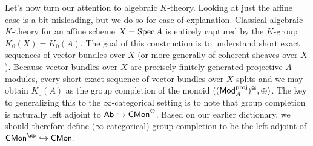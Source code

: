\documentclass[11pt]{article}
\DeclareMathOperator{\proj}{proj} %
\newcommand{\CMon}{\mathsf{CMon}} %
\begin{document}
Let's now turn our attention to algebraic $K$-theory. Looking at just the affine case is a bit misleading, but we do so for ease of explanation. Classical algebraic $K$-theory for an affine scheme $X=\operatorname{Spec} A$ is entirely captured by the $K$-group $K_0(X)=K_0(A)$. The goal of this construction is to understand short exact sequences of vector bundles over $X$ (or more generally of coherent sheaves over $X$). Because vector bundles over $X$ are precisely finitely generated projective $A$-modules, every short exact sequence of vector bundles over $X$ splits and we may obtain $K_0(A)$ as the group completion of the monoid $((\Mod_A^{\proj})^{\iso},\oplus)$. The key to generalizing this to the $\infty$-categorical setting is to note that group completion is naturally left adjoint to $\Ab\inj\CMon^{\heart}$. Based on our earlier dictionary, we should therefore define ($\infty$-categorical) group completion to be the left adjoint of $\CMon^{\gp}\inj\CMon$. 
\end{document}
